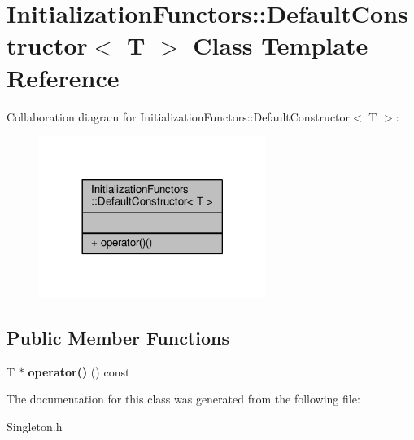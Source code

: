 \hypertarget{classInitializationFunctors_1_1DefaultConstructor}{}\section{Initialization\+Functors\+:\+:Default\+Constructor$<$ T $>$ Class Template Reference}
\label{classInitializationFunctors_1_1DefaultConstructor}


Collaboration diagram for Initialization\+Functors\+:\+:Default\+Constructor$<$ T $>$\+:
\nopagebreak
\begin{figure}[H]
\begin{center}
\leavevmode
\includegraphics[width=209pt]{d5/dc4/classInitializationFunctors_1_1DefaultConstructor__coll__graph}
\end{center}
\end{figure}
\subsection*{Public Member Functions}
\begin{DoxyCompactItemize}
\item 
T $\ast$ {\bfseries operator()} () const \hypertarget{classInitializationFunctors_1_1DefaultConstructor_a003704f6daa62cd962bf1a360b4b01ff}{}\label{classInitializationFunctors_1_1DefaultConstructor_a003704f6daa62cd962bf1a360b4b01ff}

\end{DoxyCompactItemize}


The documentation for this class was generated from the following file\+:\begin{DoxyCompactItemize}
\item 
Singleton.\+h\end{DoxyCompactItemize}
